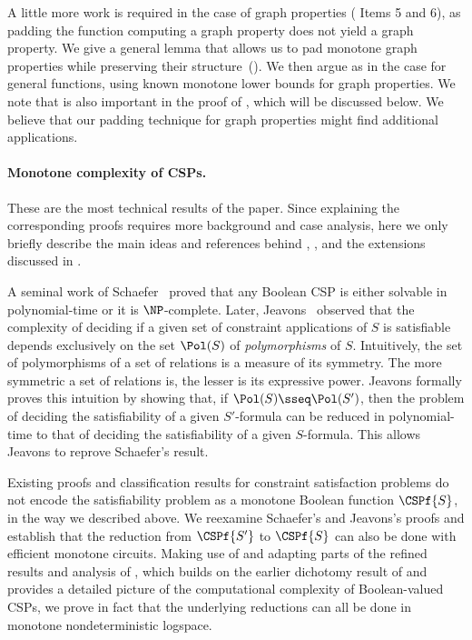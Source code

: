 \documentclass[11pt]{article}
\begin{document}
A little more work is required in the case of graph properties ( Items 5 and 6),
as
padding the function computing a graph property does not yield a graph property.
We give a general lemma that allows us to pad 
monotone graph properties
while 
preserving their structure~().
We then argue as 
in the case for general functions,
using known monotone lower bounds for graph properties. We note that  is also important in the proof of , which will be discussed below. We believe that our padding technique for graph properties might find additional applications.%




\paragraph{Monotone complexity of CSPs.} These are the most technical results of the paper. Since explaining the corresponding proofs requires more background and case analysis, here we only briefly describe the main ideas and references behind , , and the  extensions discussed in .




A seminal work of Schaefer~\cite{DBLP:conf/stoc/Schaefer78}
proved that 
any Boolean CSP 
is either solvable in polynomial-time or it is $\NP$-complete.
Later, 
Jeavons~\cite{DBLP:journals/tcs/Jeavons98}
observed that
the complexity of deciding if a given set of
constraint applications of $S$ is satisfiable
depends exclusively on 
the
set 
$\Pol(S)$
of \emph{polymorphisms} of $S$.
Intuitively, the set of polymorphisms of a set of relations
is a measure of 
 its symmetry.
The more symmetric a set of relations is, 
the lesser is its expressive power.
Jeavons formally proves this intuition by showing that,
if
$\Pol(S) \sseq \Pol(S')$,
then
the problem of deciding the satisfiability of a given $S'$-formula
can be reduced in polynomial-time
to that of deciding the satisfiability of a given $S$-formula.
This allows Jeavons to reprove
Schaefer's result.

Existing proofs and classification results for constraint satisfaction problems
do
not encode the satisfiability problem
as a monotone Boolean function 
$\CSPf{S}$, in the way we described above.
We reexamine Schaefer's and Jeavons's proofs and
establish that 
the reduction from $\CSPf{S'}$ to $\CSPf{S}$
can also be done 
with efficient monotone circuits.
Making use of and adapting parts of the refined results and analysis
of 
\cite{DBLP:journals/jcss/AllenderBISV09},
which builds
on the earlier dichotomy result of \cite{DBLP:conf/stoc/Schaefer78} and
provides a detailed picture of the computational complexity of
Boolean-valued CSPs, we  prove in fact that the underlying reductions can
all be done in monotone nondeterministic logspace.
\end{document}
